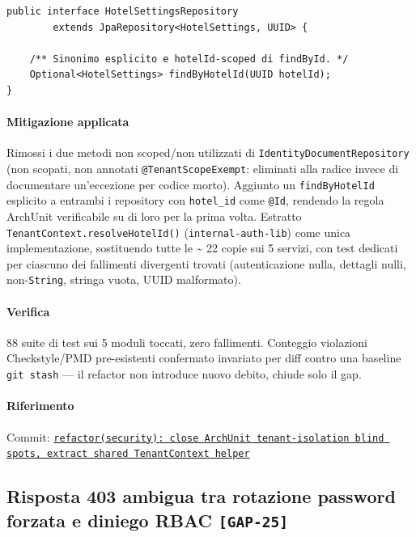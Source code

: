 ﻿\documentclass[a4paper,12pt]{report}
\newcommand{\commitref}[2]{\texttt{\small \href{https://github.com/diegoandruccioli/hotel-pms/commit/#1}{#2}}}
\newcommand{\threat}[1]{\texttt{\small\textcolor{vulnred}{[#1]}}}
\begin{document}
\begin{securebox}[title={HotelSettingsRepository.java --- metodo esplicito, regola non piu' vacua (main)}]
\begin{lstlisting}[style=java]
public interface HotelSettingsRepository
        extends JpaRepository<HotelSettings, UUID> {

    /** Sinonimo esplicito e hotelId-scoped di findById. */
    Optional<HotelSettings> findByHotelId(UUID hotelId);
}
\end{lstlisting}
\end{securebox}

\paragraph{Mitigazione applicata}
Rimossi i due metodi non scoped/non utilizzati di \texttt{IdentityDocumentRepository} (non
scopati, non annotati \texttt{@TenantScopeExempt}: eliminati alla radice invece di
documentare un'eccezione per codice morto). Aggiunto un \texttt{findByHotelId} esplicito a
entrambi i repository con \texttt{hotel\_id} come \texttt{@Id}, rendendo la regola ArchUnit
verificabile su di loro per la prima volta. Estratto \texttt{TenantContext.resolveHotelId()}
(\texttt{internal-auth-lib}) come unica implementazione, sostituendo tutte le \textasciitilde
22 copie sui 5 servizi, con test dedicati per ciascuno dei fallimenti divergenti trovati
(autenticazione nulla, dettagli nulli, non-\texttt{String}, stringa vuota, UUID malformato).

\paragraph{Verifica}
88 suite di test sui 5 moduli toccati, zero fallimenti. Conteggio violazioni
Checkstyle/PMD pre-esistenti confermato invariato per diff contro una baseline
\texttt{git stash} --- il refactor non introduce nuovo debito, chiude solo il gap.

\paragraph{Riferimento} Commit: \commitref{2f550eff}{refactor(security): close ArchUnit tenant-isolation blind spots, extract shared TenantContext helper}

\subsection{Risposta 403 ambigua tra rotazione password forzata e diniego RBAC \threat{GAP-25}}
\end{document}
